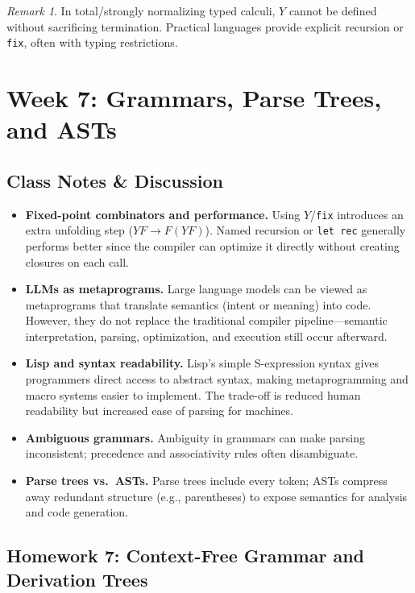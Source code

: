 \documentclass{article}
\theoremstyle{theorem}
\theoremstyle{definition}
\theoremstyle{remark}
\newtheorem{remark}[theorem]{Remark}
\begin{document}
\begin{remark}
In total/strongly normalizing typed calculi, $Y$ cannot be defined without sacrificing termination. Practical languages provide explicit recursion or \texttt{fix}, often with typing restrictions.
\end{remark}

\section{Week 7: Grammars, Parse Trees, and ASTs}

\subsection{Class Notes \& Discussion}

\begin{itemize}
  \item \textbf{Fixed-point combinators and performance.} Using $Y$/\texttt{fix} introduces an extra unfolding step ($YF \to F(YF)$). Named recursion or \texttt{let rec} generally performs better since the compiler can optimize it directly without creating closures on each call.
  \item \textbf{LLMs as metaprograms.} Large language models can be viewed as metaprograms that translate semantics (intent or meaning) into code. However, they do not replace the traditional compiler pipeline—semantic interpretation, parsing, optimization, and execution still occur afterward.
  \item \textbf{Lisp and syntax readability.} Lisp’s simple S-expression syntax gives programmers direct access to abstract syntax, making metaprogramming and macro systems easier to implement. The trade-off is reduced human readability but increased ease of parsing for machines.
  \item \textbf{Ambiguous grammars.} Ambiguity in grammars can make parsing inconsistent; precedence and associativity rules often disambiguate.
  \item \textbf{Parse trees vs.\ ASTs.} Parse trees include every token; ASTs compress away redundant structure (e.g., parentheses) to expose semantics for analysis and code generation.
\end{itemize}

\subsection{Homework 7: Context-Free Grammar and Derivation Trees}
\end{document}

